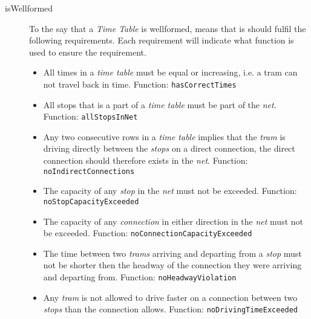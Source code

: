 \documentclass[a4]{article}
\begin{document}
\begin{description}
    \item[isWellformed] To the say that a \emph{Time Table} is wellformed, means that is should fulfil the following requirements. Each requirement will indicate what function is used to ensure the requirement.
        \begin{itemize}
            \item All times in a \emph{time table} must be equal or increasing, i.e. a tram can not travel back in time. Function: \verb=hasCorrectTimes=
            \item All stops that is a part of a \emph{time table} must be part of the \emph{net}. Function: \verb=allStopsInNet=
            \item Any two consecutive rows in a \emph{time table} implies that the \emph{tram} is driving directly between the \emph{stops} on a direct connection, the direct connection should therefore exists in the \emph{net}. Function: \verb=noIndirectConnections=
            \item The capacity of any \emph{stop} in the \emph{net} must not be exceeded. Function: \verb=noStopCapacityExceeded=
            \item The capacity of any \emph{connection} in either direction in the \emph{net} must not be exceeded. Function: \verb=noConnectionCapacityExceeded=
            \item The time between two \emph{trams} arriving and departing from a \emph{stop} must not be shorter then the headway of the connection they were arriving and departing from. Function: \verb=noHeadwayViolation=
            \item Any \emph{tram} is not allowed to drive faster on a connection between two \emph{stops} than the connection allows. Function: \verb=noDrivingTimeExceeded=
        \end{itemize}
\end{description}
\end{document}
